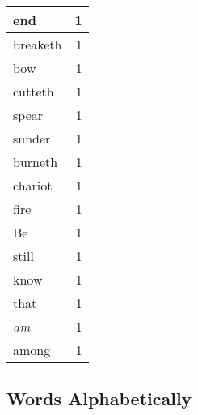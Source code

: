 \begin{center}
\begin{longtable}{l|r}
end & 1 \\ \hline
breaketh & 1 \\ \hline
bow & 1 \\ \hline
cutteth & 1 \\ \hline
spear & 1 \\ \hline
sunder & 1 \\ \hline
burneth & 1 \\ \hline
chariot & 1 \\ \hline
fire & 1 \\ \hline
Be & 1 \\ \hline
still & 1 \\ \hline
know & 1 \\ \hline
that & 1 \\ \hline
\emph{am} & 1 \\ \hline
among & 1 \\ \hline
\end{longtable}
\end{center}



\normalsize



\subsection{Words Alphabetically}

